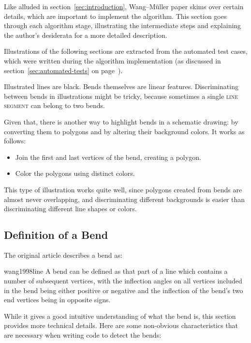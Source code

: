 \documentclass[a4paper]{article}
\newcommand{\onpage}[1]{\ref{#1} on page~\pageref{#1}}
\newcommand{\WM}{Wang--M{\"u}ller}
\begin{document}
Like alluded in section~\ref{sec:introduction}, {\WM} paper skims over
certain details, which are important to implement the algorithm. This section
goes through each algorithm stage, illustrating the intermediate steps and
explaining the author's desiderata for a more detailed description.

Illustrations of the following sections are extracted from the automated test
cases, which were written during the algorithm implementation (as discussed in
section~\onpage{sec:automated-tests}).

Illustrated lines are black. Bends themselves are linear features.
Discriminating between bends in illustrations might be tricky, because
sometimes a single \textsc{line segment} can belong to two bends.

Given that, there is another way to highlight bends in a schematic drawing: by
converting them to polygons and by altering their background colors. It works
as follows:

\begin{itemize}
    \item Join the first and last vertices of the bend, creating a polygon.
    \item Color the polygons using distinct colors.
\end{itemize}

This type of illustration works quite well, since polygons created from bends
are almost never overlapping, and discriminating different backgrounds is
easier than discriminating different line shapes or colors.

\subsection{Definition of a Bend}
\label{sec:definition-of-a-bend}

The original article describes a bend as:

\begin{displaycquote}{wang1998line}
    A bend can be defined as that part of a line which contains a number of
    subsequent vertices, with the inflection angles on all vertices included in
    the bend being either positive or negative and the inflection of the bend's
    two end vertices being in opposite signs.
\end{displaycquote}

While it gives a good intuitive understanding of what the bend is, this section
provides more technical details. Here are some non-obvious characteristics that
are necessary when writing code to detect the bends:
\end{document}
